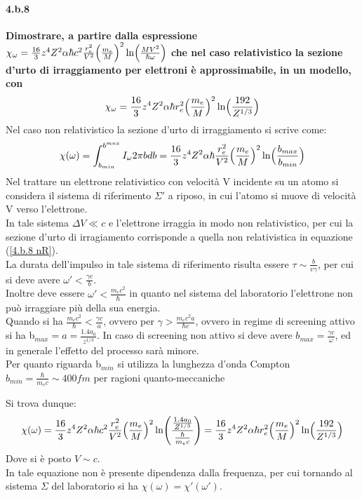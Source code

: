 \documentclass[twoside]{article}
\begin{document}
\paragraph{4.b.8}\textbf{Dimostrare, a partire dalla espressione $\chi_\omega=\frac{16}{3} z^4 Z^2 \alpha\hbar c^2 \frac{r_e^2}{V^2} \Bigl( \frac{m_e}{M} \Bigr)^2  \ln \Bigl( \frac{MV^2}{\hbar \omega}\Bigr)$ che nel caso relativistico la sezione d’urto di irraggiamento per elettroni è approssimabile, in un modello, con
\begin{equation}
    \chi_\omega=\frac{16}{3} z^4 Z^2 \alpha\hbar r_e^2 \Bigl( \frac{m_e}{M} \Bigr)^2  \ln \Bigl( \frac{192}{Z^{1/3}}\Bigr)
\end{equation}}
Nel caso non relativistico la sezione d'urto di irraggiamento si scrive come:
\begin{equation}\label{4.b.8 nR}
    \chi(\omega)=\int_{b_{min}}^{b^{max}} I_\omega2\pi bdb=\frac{16}{3} z^4 Z^2 \alpha\hbar \frac{r_e^2}{V^2}\Bigl( \frac{m_e}{M} \Bigr)^2  \ln \Bigl( \frac{b_{max}}{b_{min}}\Bigr)
\end{equation}
Nel trattare un elettrone relativistico con velocità V incidente su un atomo si considera il sistema di riferimento $\Sigma'$ a riposo, in cui l'atomo si muove di velocità V verso l'elettrone.\\
In tale sistema $\Delta V\ll c$ e l'elettrone irraggia in modo non relativistico, per cui la sezione d'urto di irragiamento corrisponde a quella non relativistica in equazione (\ref{4.b.8 nR}).\\
La durata dell'impulso in tale sistema di riferimento risulta essere $\tau\sim \frac{b}{v\gamma}$, per cui si deve avere $\omega'<\frac{\gamma c}{b}$.\\
Inoltre deve essere $\omega'<\frac{m_e c^2}{\hbar}$ in quanto nel sistema del laboratorio l'elettrone non può irraggiare più della sua energia.\\
Quando si ha $\frac{m_ec^2}{\hbar}<\frac{\gamma c}{a}$, ovvero per $\gamma>\frac{m_ec^2a}{\hbar c}$, ovvero in regime di screening attivo si ha b$_{max}=a=\frac{1.4a_0}{z^{1/3}}$. In caso di screening non attivo si deve avere $b_{max}=\frac{\gamma c}{\omega}$, ed in generale l'effetto del processo sarà minore.\\
Per quanto riguarda b$_{min}$ si utilizza la lunghezza d'onda Compton $b_{min}=\frac{\hbar}{m_ec}\sim 400 fm$ per ragioni quanto-meccaniche

Si trova dunque:
\begin{equation}
    \chi(\omega)=\frac{16}{3} z^4 Z^2 \alpha\hbar c^2\frac{r_e^2}{V^2}\Bigl( \frac{m_e}{M} \Bigr)^2  \ln \Biggl( \frac{\frac{1.4 a_0}{Z^{1/3}}}{\frac{\hbar}{m_ec}}\Biggr)=\frac{16}{3} z^4 Z^2 \alpha\hbar r_e^2 \Bigl( \frac{m_e}{M} \Bigr)^2  \ln \Bigl( \frac{192}{Z^{1/3}}\Bigr)
\end{equation}
Dove si è posto $V\sim c$.\\
In tale equazione non è presente dipendenza dalla frequenza, per cui tornando al sistema $\Sigma$ del laboratorio si ha $\chi(\omega)=\chi'(\omega')$.\\
\end{document}
